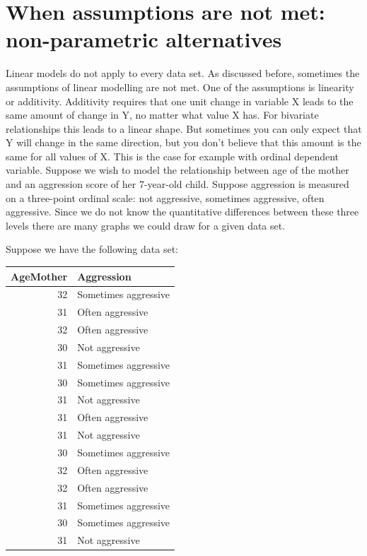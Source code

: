 \documentclass[]{report}\usepackage[]{graphicx}\usepackage[]{color}
\newenvironment{knitrout}{}{} %
\begin{document}


\chapter{When assumptions are not met: non-parametric alternatives}



Linear models do not apply to every data set. As discussed before, sometimes the assumptions of linear modelling are not met. One of the assumptions is linearity or additivity. Additivity requires that one unit change in variable X leads to the same amount of change in Y, no matter what value X has. For bivariate relationships this leads to a linear shape. But sometimes you can only expect that Y will change in the same direction, but you don't believe that this amount is the same for all values of X. This is the case for example with ordinal dependent variable. Suppose we wish to model the relationship between age of the mother and an aggression score of her 7-year-old child. Suppose aggression is measured on a three-point ordinal scale: not aggressive, sometimes aggressive, often aggressive. Since we do not know the quantitative differences between these three levels there are many graphs we could draw for a given data set.


Suppose we have the following data set:


\begin{knitrout}
\color{fgcolor}
\begin{tabular}{r|l}
\hline
AgeMother & Aggression\\
\hline
32 & Sometimes aggressive\\
\hline
31 & Often aggressive\\
\hline
32 & Often aggressive\\
\hline
30 & Not aggressive\\
\hline
31 & Sometimes aggressive\\
\hline
30 & Sometimes aggressive\\
\hline
31 & Not aggressive\\
\hline
31 & Often aggressive\\
\hline
31 & Not aggressive\\
\hline
30 & Sometimes aggressive\\
\hline
32 & Often aggressive\\
\hline
32 & Often aggressive\\
\hline
31 & Sometimes aggressive\\
\hline
30 & Sometimes aggressive\\
\hline
31 & Not aggressive\\
\hline
\end{tabular}


\end{knitrout}
\end{document}
